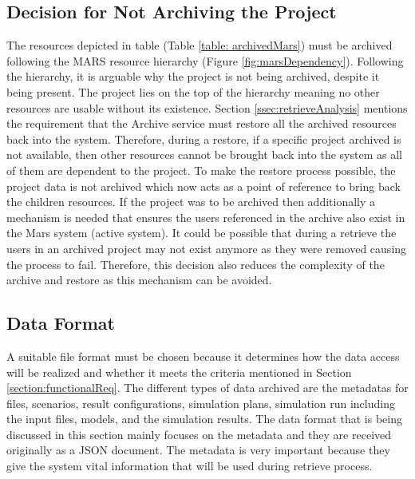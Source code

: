 \subsection{Decision for Not Archiving the Project}
The resources depicted in table (Table \ref{table: archivedMars}) must be archived following the MARS resource hierarchy (Figure \ref{fig:marsDependency}).
Following the hierarchy, it is arguable why the project is not being archived, despite it being present. The project lies on the top of the hierarchy 
meaning no other resources are usable without its existence. Section \ref{ssec:retrieveAnalysis} mentions the requirement that the Archive service must 
restore all the archived resources back into the system. Therefore, during a restore, if a specific project archived
is not available, then other resources cannot be brought back into the system as all of them are dependent to the project. To make the restore process possible,
the project data is not archived which now acts as a point of reference to bring back the children resources. 
If the project was to be archived then additionally a mechanism is needed that ensures the users referenced in the archive also exist in the Mars system (active system).
It could be possible that during a retrieve the users in an
archived project may not exist anymore as they were removed causing the process to fail. Therefore, this decision also reduces the complexity of the 
archive and restore as this mechanism can be avoided.


\subsection{Data Format}
A suitable file format must be chosen because it determines how the data access will be realized and whether it meets
the criteria mentioned in Section \ref{section:functionalReq}. The different types of data archived are the metadatas for files, scenarios, 
result configurations, simulation plans, simulation run including the input files, models, and the simulation results. 
The data format that is being discussed in this section mainly focuses on the metadata and they are received originally as a JSON document.
The metadata is very important because they give the system vital information that will be used during retrieve process. 

